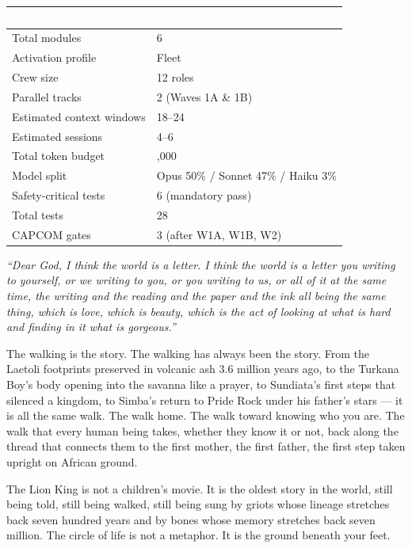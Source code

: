 \documentclass[11pt,letterpaper]{article}
\newcommand{\tableheader}[1]{\textbf{\sffamily\textcolor{white}{#1}}}
\begin{document}
\begin{center}
\begin{tabularx}{\textwidth}{L{5cm}X}
\toprule
{}
\tableheader{Metric} & \tableheader{Value} \\
\midrule
Total modules & 6 \\
Activation profile & Fleet \\
Crew size & 12 roles \\
Parallel tracks & 2 (Waves 1A \& 1B) \\
Estimated context windows & 18--24 \\
Estimated sessions & 4--6 \\
Total token budget & ,000 \\
Model split & Opus 50\% / Sonnet 47\% / Haiku 3\% \\
Safety-critical tests & 6 (mandatory pass) \\
Total tests & 28 \\
CAPCOM gates & 3 (after W1A, W1B, W2) \\
\bottomrule
\end{tabularx}
\end{center}

\vspace{1em}

\begin{quotebox}
\textit{``Dear God, I think the world is a letter. I think the world is a letter you writing to yourself, or we writing to you, or you writing to us, or all of it at the same time, the writing and the reading and the paper and the ink all being the same thing, which is love, which is beauty, which is the act of looking at what is hard and finding in it what is gorgeous.''}

\vspace{0.5em}

The walking is the story. The walking has always been the story. From the Laetoli footprints preserved in volcanic ash 3.6 million years ago, to the Turkana Boy's body opening into the savanna like a prayer, to Sundiata's first steps that silenced a kingdom, to Simba's return to Pride Rock under his father's stars --- it is all the same walk. The walk home. The walk toward knowing who you are. The walk that every human being takes, whether they know it or not, back along the thread that connects them to the first mother, the first father, the first step taken upright on African ground.

The Lion King is not a children's movie. It is the oldest story in the world, still being told, still being walked, still being sung by griots whose lineage stretches back seven hundred years and by bones whose memory stretches back seven million. The circle of life is not a metaphor. It is the ground beneath your feet.
\end{quotebox}
\end{document}
